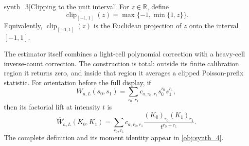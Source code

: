 \documentclass[11pt]{article}
\begin{document}
\begin{definitionv}{synth_3}[Clipping to the unit interval]
For \(z\in\mathbb R\), define
\[
\operatorname{clip}_{[-1,1]}(z)
=
\max\{-1,\min\{1,z\}\}.
\]
Equivalently, \(\operatorname{clip}_{[-1,1]}(z)\) is the Euclidean projection of \(z\) onto the interval \([-1,1]\).
\end{definitionv}

The estimator itself combines a light-cell polynomial correction with a heavy-cell inverse-count correction. The construction is total: outside its finite calibration region it returns zero, and inside that region it averages a clipped Poisson-prefix statistic. For orientation before the full display, if
\[
W_{a,L}(s_0,s_1)=\sum_{r_0,r_1}c_{a,r_0,r_1}s_0^{r_0}s_1^{r_1},
\]
then its factorial lift at intensity \(t\) is
\[
\widehat W_{a,L}(K_0,K_1)
=
\sum_{r_0,r_1}c_{a,r_0,r_1}
\frac{(K_0)_{r_0}(K_1)_{r_1}}{t^{r_0+r_1}}.
\]
The complete definition and its moment identity appear in \cref{obj:synth_4}.
\end{document}
